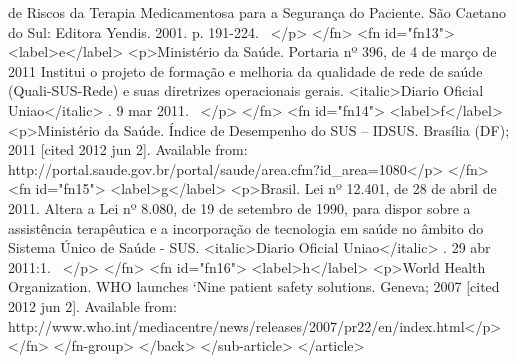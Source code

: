             de Riscos da Terapia Medicamentosa para a Segurança do Paciente. São Caetano do Sul:
            Editora Yendis. 2001. p. 191-224.  </p>
        </fn>
        <fn id="fn13">
          <label>e</label>
          <p>Ministério da Saúde. Portaria nº 396, de 4 de março de 2011 Institui o projeto de
            formação e melhoria da qualidade de rede de saúde (Quali-SUS-Rede) e suas diretrizes
            operacionais gerais. <italic>Diario Oficial Uniao</italic> . 9 mar 2011.  </p>
        </fn>
        <fn id="fn14">
          <label>f</label>
          <p>Ministério da Saúde. Índice de Desempenho do SUS – IDSUS. Brasília (DF); 2011 [cited
            2012 jun 2]. Available from:
            http://portal.saude.gov.br/portal/saude/area.cfm?id_area=1080</p>
        </fn>
        <fn id="fn15">
          <label>g</label>
          <p>Brasil. Lei nº 12.401, de 28 de abril de 2011. Altera a Lei nº 8.080, de 19 de setembro
            de 1990, para dispor sobre a assistência terapêutica e a incorporação de tecnologia em
            saúde no âmbito do Sistema Único de Saúde - SUS. <italic>Diario Oficial Uniao</italic> .
            29 abr 2011:1.  </p>
        </fn>
        <fn id="fn16">
          <label>h</label>
          <p>World Health Organization. WHO launches ‘Nine patient safety solutions. Geneva; 2007
            [cited 2012 jun 2]. Available from:
            http://www.who.int/mediacentre/news/releases/2007/pr22/en/index.html</p>
        </fn>
      </fn-group>
    </back>
  </sub-article>
</article>
